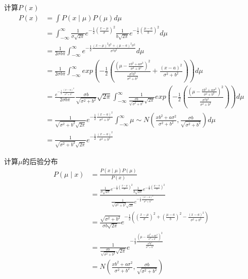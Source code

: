 \documentclass[12pt, a4paper, oneside, fontset=windows]{ctexart}
\begin{document}
计算$P(x)$
\begin{align*}
    P(x) &= \int P(x \mid \mu) P(\mu) d\mu\\
    &=\int_{-\infty}^{\infty} \frac{1}{\sigma \sqrt{2 \pi}} e^{-\frac{1}{2}\left(\frac{x-\mu}{\sigma}\right)^{2}}\frac{1}{b \sqrt{2 \pi}} e^{-\frac{1}{2}\left(\frac{\mu-a}{b}\right)^{2}} d\mu\\
    &=\frac{1}{2 \sigma b \pi}\int_{-\infty}^{\infty} e^{-\frac{1}{2}\frac{(x-\mu)^2b^2+(\mu-a)^2\sigma^2}{\sigma^2 b^2}} d\mu\\
    &=\frac{1}{2 \sigma b \pi}\int_{-\infty}^{\infty}exp\left(-\frac{1}{2}\left(\frac{\left(\mu-\frac{xb^2+a\sigma^2}{\sigma^2+b^2}\right)^2}{\frac{\sigma^2b^2}{\sigma^2+b^2}}+\frac{(x-a)^2}{\sigma^2+b^2}\right)\right)d\mu\\
    &=\frac{e^{-\frac{1}{2}\frac{(x-a)^2}{\sigma^2+b^2}}}{2 \sigma b \pi}\frac{\sigma b}{\sqrt{\sigma^2+b^2}}\sqrt{2 \pi}\int_{-\infty}^{\infty}\frac{1}{\frac{\sigma b}{\sqrt{\sigma^2+b^2}}\sqrt{2 \pi}}exp\left(-\frac{1}{2}\left(\frac{\left(\mu-\frac{xb^2+a\sigma^2}{\sigma^2+b^2}\right)^2}{\frac{\sigma^2b^2}{\sigma^2+b^2}}\right)\right)d\mu\\
    &=\frac{1}{\sqrt{\sigma^2+b^2}\sqrt{2 \pi}}e^{-\frac{1}{2}\frac{(x-a)^2}{\sigma^2+b^2}}\int_{-\infty}^{\infty} \mu\sim N\left(\frac{xb^2+a\sigma^2}{\sigma^2+b^2},\frac{\sigma b}{\sqrt{\sigma^2+b^2}}\right)d\mu\\
    &=\frac{1}{\sqrt{\sigma^2+b^2}\sqrt{2 \pi}}e^{-\frac{1}{2}\frac{(x-a)^2}{\sigma^2+b^2}}
\end{align*}

计算$\mu$的后验分布
\begin{align*}
    P(\mu \mid x) &= \frac{P(x \mid \mu)P(\mu)}{P(x)}\\
    &=\frac{\frac{1}{\sigma \sqrt{2 \pi}} e^{-\frac{1}{2}\left(\frac{x-\mu}{\sigma}\right)^{2}}\frac{1}{b \sqrt{2 \pi}} e^{-\frac{1}{2}\left(\frac{\mu-a}{b}\right)^{2}}}{\frac{1}{\sqrt{\sigma^2+b^2}\sqrt{2 \pi}}e^{-\frac{1}{2}\frac{(x-a)^2}{\sigma^2+b^2}}}\\
    &=\frac{\sqrt{\sigma^2+b^2}}{\sigma b\sqrt{2 \pi}}e^{-\frac{1}{2}\left(\left(\frac{x-\mu}{\sigma}\right)^{2}+\left(\frac{\mu-a}{b}\right)^{2}-\frac{(x-a)^2}{\sigma^2+b^2}\right)}\\
    &=\frac{1}{\frac{\sigma b}{\sqrt{\sigma^2+b^2}}\sqrt{2 \pi}}e^{-\frac{1}{2}\frac{\left(\mu-\frac{xb^2+a\sigma^2}{\sigma^2+b^2}\right)^2}{\frac{\sigma^2b^2}{\sigma^2+b^2}}}\\
    &=N\left(\frac{xb^2+a\sigma^2}{\sigma^2+b^2},\frac{\sigma b}{\sqrt{\sigma^2+b^2}}\right)
\end{align*}
\end{document}
